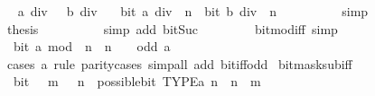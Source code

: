 \begin{isabellebody}
\ \isamarkupfalse%
\ {\isacartoucheopen}a\ div\ {}\ {\isacharequal}{\kern0pt}\ b\ div\ {}{\isacartoucheclose}\ \isamarkupfalse%
\ {\isacartoucheopen}bit\ {\isacharparenleft}{\kern0pt}a\ div\ {}{\isacharparenright}{\kern0pt}\ n\ {\isacharequal}{\kern0pt}\ bit\ {\isacharparenleft}{\kern0pt}b\ div\ {}{\isacharparenright}{\kern0pt}\ n{\isacartoucheclose}\isanewline
\ \ \ \ \ \ \ \ \isamarkupfalse%
\ simp\isanewline
\ \ \ \ \ \ \isamarkupfalse%
\ \isamarkupfalse%
\ {\isacharquery}{\kern0pt}thesis\isanewline
\ \ \ \ \ \ \ \ \isamarkupfalse%
\ {\isacharparenleft}{\kern0pt}simp\ add{\isacharcolon}{\kern0pt}\ bit{\isacharunderscore}{\kern0pt}Suc{\isacharparenright}{\kern0pt}\isanewline
\ \ \ \ \isamarkupfalse%
\isanewline
\ \ \isamarkupfalse%
\isanewline
{}\isamarkupfalse%
%
\endisatagproof
{\isafoldproof}%
%
\isadelimproof
\isanewline
%
\endisadelimproof
\isanewline
{}\isamarkupfalse%
\ bit{\isacharunderscore}{\kern0pt}mod{\isacharunderscore}{\kern0pt}{}{\isacharunderscore}{\kern0pt}iff\ {\isacharbrackleft}{\kern0pt}simp{\isacharbrackright}{\kern0pt}{\isacharcolon}{\kern0pt}\isanewline
\ \ {\isacartoucheopen}bit\ {\isacharparenleft}{\kern0pt}a\ mod\ {}{\isacharparenright}{\kern0pt}\ n\ {\isasymlongleftrightarrow}\ n\ {\isacharequal}{\kern0pt}\ {}\ {\isasymand}\ odd\ a{\isacartoucheclose}\isanewline
%
\isadelimproof
\ \ %
\endisadelimproof
%
\isatagproof
{}\isamarkupfalse%
\ {\isacharparenleft}{\kern0pt}cases\ a\ rule{\isacharcolon}{\kern0pt}\ parity{\isacharunderscore}{\kern0pt}cases{\isacharparenright}{\kern0pt}\ {\isacharparenleft}{\kern0pt}simp{\isacharunderscore}{\kern0pt}all\ add{\isacharcolon}{\kern0pt}\ bit{\isacharunderscore}{\kern0pt}iff{\isacharunderscore}{\kern0pt}odd{\isacharparenright}{\kern0pt}%
\endisatagproof
{\isafoldproof}%
%
\isadelimproof
\isanewline
%
\endisadelimproof
\isanewline
{}\isamarkupfalse%
\ bit{\isacharunderscore}{\kern0pt}mask{\isacharunderscore}{\kern0pt}sub{\isacharunderscore}{\kern0pt}iff{\isacharcolon}{\kern0pt}\isanewline
\ \ {\isacartoucheopen}bit\ {\isacharparenleft}{\kern0pt}{}\ {\isacharcircum}{\kern0pt}\ m\ {\isacharminus}{\kern0pt}\ {}{\isacharparenright}{\kern0pt}\ n\ {\isasymlongleftrightarrow}\ possible{\isacharunderscore}{\kern0pt}bit\ TYPE{\isacharparenleft}{\kern0pt}{\isacharprime}{\kern0pt}a{\isacharparenright}{\kern0pt}\ n\ {\isasymand}\ n\ {\isacharless}{\kern0pt}\ m{\isacartoucheclose}\isanewline

\end{isabellebody}
